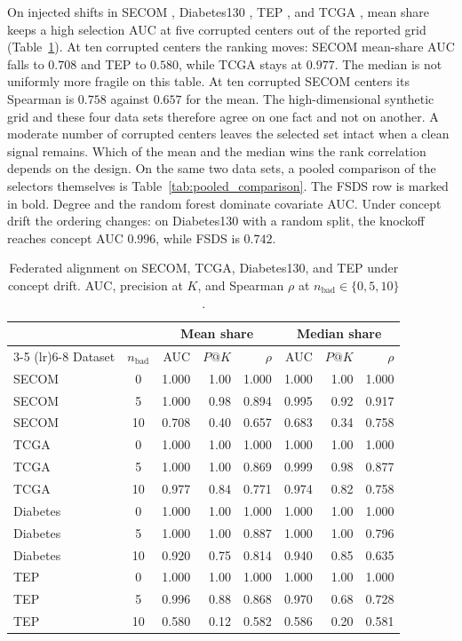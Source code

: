 On injected shifts in SECOM \cite{secom2008}, Diabetes130
\cite{clore2014diabetes130}, TEP \cite{chiang2001fault}, and TCGA
\cite{weinstein2013tcga}, mean share keeps a high selection AUC at five
corrupted centers out of the reported grid
(Table~\ref{tab:federated_real_data}).
At ten corrupted centers the ranking moves: SECOM mean-share AUC falls to
\(0.708\) and TEP to \(0.580\), while TCGA stays at \(0.977\).
The median is not uniformly more fragile on this table.
At ten corrupted SECOM centers its Spearman is \(0.758\) against \(0.657\)
for the mean.
The high-dimensional synthetic grid and these four data sets therefore
agree on one fact and not on another.
A moderate number of corrupted centers leaves the selected set intact when
a clean signal remains.
Which of the mean and the median wins the rank correlation depends on the
design.
On the same two data sets, a pooled comparison of the selectors themselves
is Table~\ref{tab:pooled_comparison}.
The FSDS row is marked in bold.
Degree and the random forest dominate covariate AUC.
Under concept drift the ordering changes: on Diabetes130 with a random
split, the knockoff reaches concept AUC \(0.996\), while FSDS is \(0.742\).

\begin{table}[t]
\centering
\caption{Federated alignment on SECOM, TCGA, Diabetes130, and TEP under
concept drift.
AUC, precision at \(K\), and Spearman \(\rho\) at
\(n_{\mathrm{bad}}\in\{0,5,10\}\).}
\label{tab:federated_real_data}
\small
\setlength{\tabcolsep}{4pt}
\begin{tabular}{l c rrr rrr}
\toprule
 & & \multicolumn{3}{c}{Mean share} & \multicolumn{3}{c}{Median share} \\
\cmidrule(lr){3-5} \cmidrule(lr){6-8}
Dataset & \(n_{\mathrm{bad}}\) & AUC & \(P@K\) & \(\rho\) & AUC & \(P@K\) & \(\rho\) \\
\midrule
SECOM & 0  & 1.000 & 1.00 & 1.000 & 1.000 & 1.00 & 1.000 \\
SECOM & 5  & 1.000 & 0.98 & 0.894 & 0.995 & 0.92 & 0.917 \\
SECOM & 10 & 0.708 & 0.40 & 0.657 & 0.683 & 0.34 & 0.758 \\
\midrule
TCGA & 0  & 1.000 & 1.00 & 1.000 & 1.000 & 1.00 & 1.000 \\
TCGA & 5  & 1.000 & 1.00 & 0.869 & 0.999 & 0.98 & 0.877 \\
TCGA & 10 & 0.977 & 0.84 & 0.771 & 0.974 & 0.82 & 0.758 \\
\midrule
Diabetes & 0  & 1.000 & 1.00 & 1.000 & 1.000 & 1.00 & 1.000 \\
Diabetes & 5  & 1.000 & 1.00 & 0.887 & 1.000 & 1.00 & 0.796 \\
Diabetes & 10 & 0.920 & 0.75 & 0.814 & 0.940 & 0.85 & 0.635 \\
\midrule
TEP & 0  & 1.000 & 1.00 & 1.000 & 1.000 & 1.00 & 1.000 \\
TEP & 5  & 0.996 & 0.88 & 0.868 & 0.970 & 0.68 & 0.728 \\
TEP & 10 & 0.580 & 0.12 & 0.582 & 0.586 & 0.20 & 0.581 \\
\bottomrule
\end{tabular}
\end{table}

